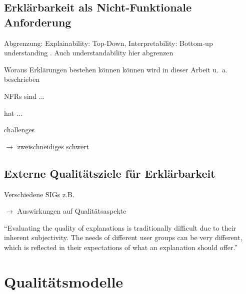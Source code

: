 \subsection{Erklärbarkeit als Nicht-Funktionale Anforderung}
\label{02_basics:explainability}

\smallskip

\noindent{}

\smallskip

Abgrenzung: Explainability: Top-Down, Interpretability: Bottom-up understanding \cite{thomson_knowledge--information_2020}. Auch understandability hier abgrenzen

Woraus Erklärungen bestehen können können wird in dieser Arbeit u.~a. beschrieben

NFRs sind ... \cite{chung2009non, schneider2012abenteuer}

\citeauthor{kohl_explainability_2019} hat ...

\citeauthor{chazette2020explainability} challenges

\citeauthor{chazette_end-users_nodate} $\rightarrow$ zweischneidiges schwert

\subsection{Externe Qualitätsziele für Erklärbarkeit}
\label{02_basics:quality_quaracteristic}

Verschiedene SIGs z.B. \cite{do2010software}

\citeauthor{chazette_knowledge_nodate} $\rightarrow$ Auswirkungen auf Qualitätsaspekte

“Evaluating the quality of explanations is traditionally difficult due to their inherent subjectivity. The needs of different user groups can be very different, which is reflected in their expectations of what an explanation should offer.” \cite{martin_developing_2019, martin_evaluating_2021}

\section{Qualitätsmodelle}
\label{sec:basics_quality_models}

